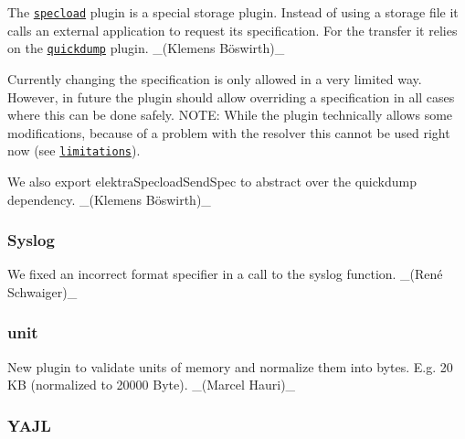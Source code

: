 \begin{DoxyItemize}
\item The \href{https://www.libelektra.org/plugins/specload}{\tt specload} plugin is a special storage plugin. Instead of using a storage file it calls an external application to request its specification. For the transfer it relies on the \href{https://www.libelektra.org/plugins/quickdump}{\tt quickdump} plugin. \+\_\+(Klemens Böswirth)\+\_\+
\item Currently changing the specification is only allowed in a very limited way. However, in future the plugin should allow overriding a specification in all cases where this can be done safely. N\+O\+TE\+: While the plugin technically allows some modifications, because of a problem with the resolver this cannot be used right now (see \href{https://www.libelektra.org/plugins/specload}{\tt limitations}).
\item We also export {\ttfamily elektra\+Specload\+Send\+Spec} to abstract over the {\ttfamily quickdump} dependency. \+\_\+(Klemens Böswirth)\+\_\+
\end{DoxyItemize}

\subsubsection*{Syslog}


\begin{DoxyItemize}
\item We fixed an incorrect format specifier in a call to the {\ttfamily syslog} function. \+\_\+(René Schwaiger)\+\_\+
\end{DoxyItemize}

\subsubsection*{unit}


\begin{DoxyItemize}
\item New plugin to validate units of memory and normalize them into bytes. E.\+g. 20 KB (normalized to 20000 Byte). \+\_\+(\+Marcel Hauri)\+\_\+
\end{DoxyItemize}

\subsubsection*{Y\+A\+JL}


